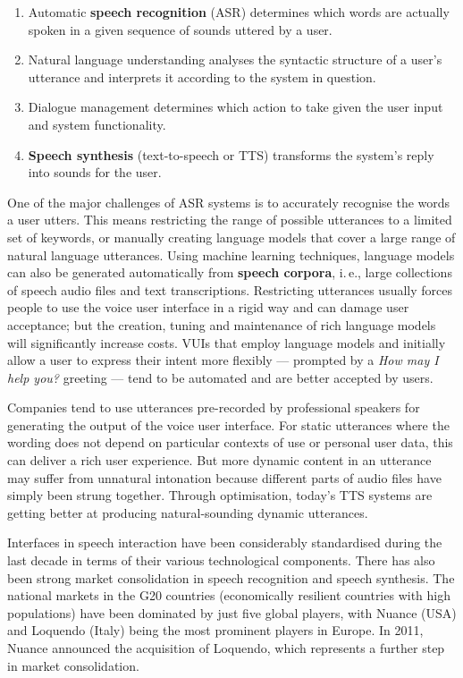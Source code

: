 \begin{multicols}{2}
\begin{enumerate}
\item Automatic \textbf{speech recognition} (ASR) determines which words are actually spoken in a given sequence of sounds uttered by a user.  
\columnbreak
\item Natural language understanding analyses the syntactic structure of a user’s utterance and interprets it according to the system in question.
\item Dialogue management determines which action to take given the user input and system functionality.   
\item \textbf{Speech synthesis} (text-to-speech or TTS) transforms the system’s reply into sounds for the user.
\end{enumerate}

One of the major challenges of ASR systems is to accurately recognise the words a user utters. This means restricting the range of possible utterances to a limited set of keywords, or manually creating language models that cover a large range of natural language utterances. Using machine learning techniques, language models can also be generated automatically from \textbf{speech corpora}, i.\,e., large collections of speech audio files and text transcriptions. Restricting utterances usually forces people to use the voice user interface in a rigid way and can damage user acceptance; but the creation, tuning and maintenance of rich language models will significantly increase costs. VUIs that employ language models and initially allow a user to express their intent more flexibly — prompted by a \textit{How may I help you?} greeting — tend to be automated and are better accepted by users.


Companies tend to use utterances pre-recorded by professional speakers for generating the output of the voice user interface. For static utterances where the wording does not depend on particular contexts of use or personal user data, this can deliver a rich user experience. But more dynamic content in an utterance may suffer from unnatural intonation because different parts of audio files have simply been strung together. Through optimisation, today’s TTS systems are getting better at producing natural-sounding dynamic utterances.

Interfaces in speech interaction have been considerably standardised during the last decade in terms of their various technological components. There has also been strong market consolidation in speech recognition and speech synthesis. The national markets in the G20 countries (economically resilient countries with high populations) have been dominated by just five global players, with Nuance (USA) and Loquendo (Italy) being the most prominent players in Europe. In 2011, Nuance announced the acquisition of Loquendo, which represents a further step in market consolidation.


\end{multicols}
